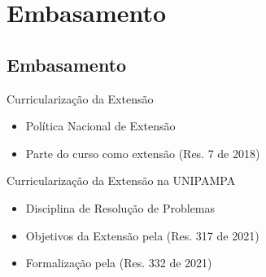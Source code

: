 \section{Embasamento}
\subsection*{Embasamento}

\begin{frame}{{\sffamily Curricularização da Extensão}}
  \begin{block}{}
    \begin{itemize}
      \item Política Nacional de Extensão
      \item Parte do curso como extensão (Res. 7 de 2018)
    \end{itemize}

  \end{block}
\end{frame}

\begin{frame}{{\sffamily Curricularização da Extensão na UNIPAMPA}}
  \begin{block}{}
    \begin{itemize}
      \item Disciplina de Resolução de Problemas
      \item Objetivos da Extensão pela (Res. 317 de 2021)
      \item Formalização pela (Res. 332 de 2021)
    \end{itemize}

  \end{block}
\end{frame}

